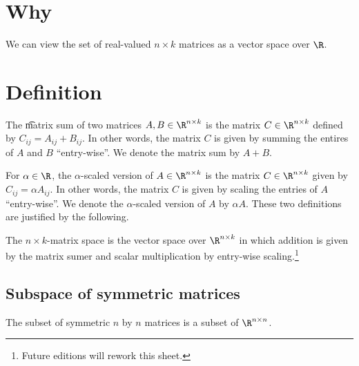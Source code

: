 
\section*{Why}

We can view the set of real-valued $n \times k$ matrices as a vector space over $\R $.

\section*{Definition}

The \t{matrix sum} of two matrices $A, B \in \R ^{n \times k}$ is the matrix $C \in \R ^{n \times k}$ defined by $C_{ij} = A_{ij} + B_{ij}$.
In other words, the matrix $C$ is given by summing the entires of $A$ and $B$ ``entry-wise''.
We denote the matrix sum by $A + B$.

For $\alpha  \in \R $, the \t{$\alpha $-scaled version} of $A \in \R ^{n \times k}$ is the matrix $C \in \R ^{n \times k}$ given by $C_{ij} = \alpha  A_{ij}$.
In other words, the matrix $C$ is given by scaling the entries of $A$ ``entry-wise''.
We denote the $\alpha $-scaled version of $A$ by $\alpha  A$.
These two definitions are justified by the following.

The \t{$n \times k$-matrix space} is the vector space over $\R ^{n \times  k}$ in which addition is given by the matrix sumer and scalar multiplication by entry-wise scaling.\footnote{Future editions will rework this sheet.}

\subsection*{Subspace of symmetric matrices}

The subset of symmetric $n$ by $n$ matrices is a subset of $\R ^{n \times  n}$.

\blankpage